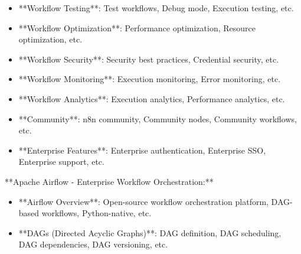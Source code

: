 \documentclass[11pt,a4paper]{article}
\begin{document}
\begin{itemize}
\item **Workflow Testing**: Test workflows, Debug mode, Execution testing, etc.
\end{itemize}

\begin{itemize}
\item **Workflow Optimization**: Performance optimization, Resource optimization, etc.
\end{itemize}

\begin{itemize}
\item **Workflow Security**: Security best practices, Credential security, etc.
\end{itemize}

\begin{itemize}
\item **Workflow Monitoring**: Execution monitoring, Error monitoring, etc.
\end{itemize}

\begin{itemize}
\item **Workflow Analytics**: Execution analytics, Performance analytics, etc.
\end{itemize}

\begin{itemize}
\item **Community**: n8n community, Community nodes, Community workflows, etc.
\end{itemize}

\begin{itemize}
\item **Enterprise Features**: Enterprise authentication, Enterprise SSO, Enterprise support, etc.
\end{itemize}

**Apache Airflow - Enterprise Workflow Orchestration:**

\begin{itemize}
\item **Airflow Overview**: Open-source workflow orchestration platform, DAG-based workflows, Python-native, etc.
\end{itemize}

\begin{itemize}
\item **DAGs (Directed Acyclic Graphs)**: DAG definition, DAG scheduling, DAG dependencies, DAG versioning, etc.
\end{itemize}
\end{document}
